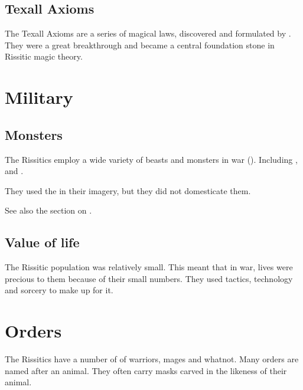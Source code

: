 \subsection{Texall Axioms}
The Texall Axioms are a series of magical laws, discovered and formulated by . 
They were a great breakthrough and became a central foundation stone in Rissitic magic theory. 















\section{Military}





\subsection{Monsters}
The Rissitics employ a wide variety of beasts and monsters in war ().
Including \lothae, \mezolisks and \corgoroth. 

They used the  in their imagery, but they did not domesticate them. 

See also the section on . 





\subsection{Value of life}
The Rissitic population was relatively small. 
This meant that in war, lives were precious to them because of their small numbers.
They used tactics, technology and sorcery to make up for it.















\section{Orders}
The Rissitics have a number of  of warriors, mages and whatnot. 
Many orders are named after an animal. 
They often carry masks carved in the likeness of their animal. 





